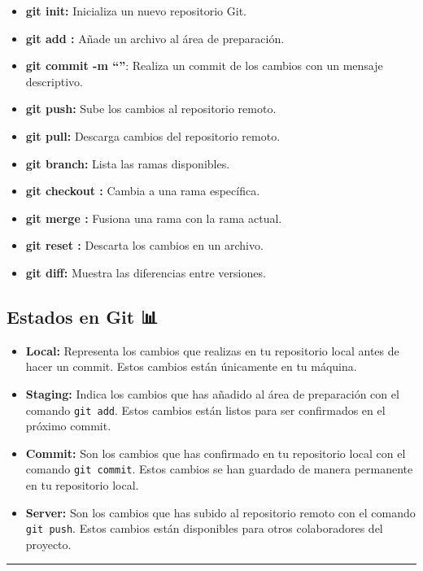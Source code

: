 \documentclass[
  a4paper,
  DIV=11,
  numbers=noendperiod,
  onepage,
  openany]{scrreprt}
\providecommand{\tightlist}{%
  \setlength{\itemsep}{0pt}\setlength{\parskip}{0pt}}\usepackage{longtable,booktabs,array}
\begin{document}
\begin{itemize}
\tightlist
\item
  \textbf{git init:} Inicializa un nuevo repositorio Git.
\item
  \textbf{git add :} Añade un archivo al área de preparación.
\item
  \textbf{git commit -m ``''}: Realiza un commit de los cambios con un
  mensaje descriptivo.
\item
  \textbf{git push:} Sube los cambios al repositorio remoto.
\item
  \textbf{git pull:} Descarga cambios del repositorio remoto.
\item
  \textbf{git branch:} Lista las ramas disponibles.
\item
  \textbf{git checkout :} Cambia a una rama específica.
\item
  \textbf{git merge :} Fusiona una rama con la rama actual.
\item
  \textbf{git reset :} Descarta los cambios en un archivo.
\item
  \textbf{git diff:} Muestra las diferencias entre versiones.
\end{itemize}

\subsection{Estados en Git 📊}\label{estados-en-git}

\begin{itemize}
\tightlist
\item
  \textbf{Local:} Representa los cambios que realizas en tu repositorio
  local antes de hacer un commit. Estos cambios están únicamente en tu
  máquina.
\item
  \textbf{Staging:} Indica los cambios que has añadido al área de
  preparación con el comando \texttt{git\ add}. Estos cambios están
  listos para ser confirmados en el próximo commit.
\item
  \textbf{Commit:} Son los cambios que has confirmado en tu repositorio
  local con el comando \texttt{git\ commit}. Estos cambios se han
  guardado de manera permanente en tu repositorio local.
\item
  \textbf{Server:} Son los cambios que has subido al repositorio remoto
  con el comando \texttt{git\ push}. Estos cambios están disponibles
  para otros colaboradores del proyecto.
\end{itemize}

\begin{center}\rule{0.5\linewidth}{0.5pt}\end{center}
\end{document}
